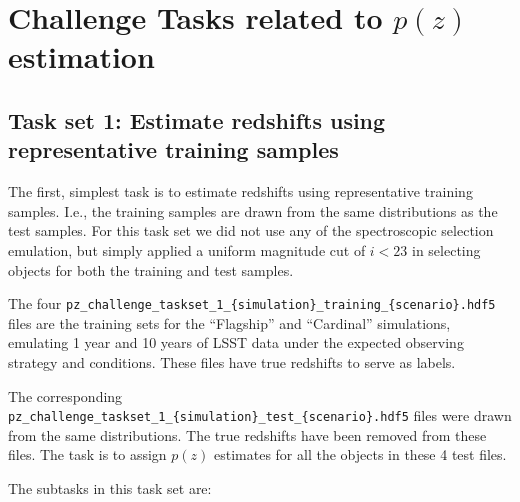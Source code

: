 \documentclass[11pt,twoside,letterpaper,onecolumn,english]{article}
\begin{document}








\section{\texorpdfstring{Challenge Tasks related to $p(z)$ estimation}{Challenge Tasks related to p(z) estimation}}
\label{sec:tasks}

\subsection{Task set 1: Estimate redshifts using representative
  training samples}

The first, simplest task is to estimate redshifts using
representative training samples. I.e., the training samples are drawn
from the same distributions as the test samples. For this task set we
did not use any of the spectroscopic selection emulation, but simply
applied a uniform magnitude cut of $i < 23$ in selecting objects for both
the training and test samples.

The four 
\texttt{pz\_challenge\_taskset\_1\_\{simulation\}\_training\_\{scenario\}.hdf5}
files are the training sets for the ``Flagship'' and ``Cardinal''
simulations, emulating 1 year and 10 years of LSST data under the
expected observing strategy and conditions. These files have true
redshifts to serve as labels.

The corresponding 
\texttt{pz\_challenge\_taskset\_1\_\{simulation\}\_test\_\{scenario\}.hdf5}
files were \allowbreak drawn from the same distributions. The true redshifts have
been removed from these files. The task is to assign $p(z)$
estimates for all the objects in these 4 test files.

The subtasks in this task set are:
\end{document}
